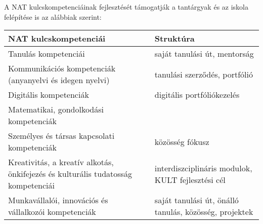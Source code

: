 A NAT kulcskompetenciáinak fejlesztését támogatják a tantárgyak és az
iskola felépítése is az alábbiak szerint:

\begin{longtable}[]{*{2}{>{\begin{minipage}[t]{.46\textwidth}\strut\raggedright}l<{\strut\end{minipage}}}}
\toprule
\textbf{NAT kulcskompetenciái}
  &\textbf{Struktúra}
\tabularnewline
\midrule
\endhead
Tanulás kompetenciái
  &saját tanulási út, mentorság
\tabularnewline
\midrule
Kommunikációs kompetenciák (anyanyelvi és idegen nyelvi)
  &tanulási szerződés, portfólió
\tabularnewline
\midrule
Digitális kompetenciák
  &digitális portfóliókezelés
\tabularnewline
\midrule
Matematikai, gondolkodási kompetenciák
  & %
\tabularnewline
\midrule
Személyes és társas kapcsolati kompetenciák
  &közösség fókusz
\tabularnewline
\midrule
Kreativitás, a kreatív alkotás, önkifejezés és kulturális tudatosság
kompetenciái
  &interdiszciplináris modulok, KULT fejlesztési cél
\tabularnewline
\midrule
Munkavállalói, innovációs és vállalkozói kompetenciák
  &saját tanulási út, önálló tanulás, közösség, projektek
\tabularnewline
\bottomrule
\end{longtable}

